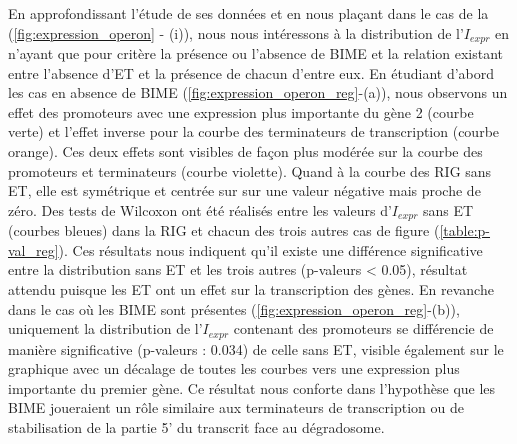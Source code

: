 \documentclass[12pt,a4paper]{report}
\begin{document}
\begin{onehalfspace}
En approfondissant l'étude de ses données et en nous plaçant dans le cas de la (\autoref{fig:expression_operon} - (i)), nous nous intéressons à la distribution de l'$I_{expr}$ en n'ayant que pour critère la présence ou l'absence de BIME et la relation existant entre l'absence d'ET et la présence de chacun d'entre eux. En étudiant d'abord les cas en absence de BIME (\autoref{fig:expression_operon_reg}-(a)), nous observons un effet des promoteurs avec une expression plus importante du gène 2 (courbe verte) et l'effet inverse pour la courbe des terminateurs de transcription (courbe orange). Ces deux effets sont visibles de façon plus modérée sur la courbe des promoteurs et terminateurs (courbe violette). Quand à la courbe des RIG sans ET, elle est symétrique et centrée sur sur une valeur négative mais proche de zéro. Des tests de Wilcoxon ont été réalisés entre les valeurs d'$I_{expr}$ sans ET (courbes bleues) dans la RIG et chacun des trois autres cas de figure (\autoref{table:p-val_reg}). Ces résultats nous indiquent qu'il existe une différence significative entre la distribution sans ET et les trois autres (p-valeurs < 0.05), résultat attendu puisque les ET ont un effet sur la transcription des gènes. En revanche dans le cas où les BIME sont présentes (\autoref{fig:expression_operon_reg}-(b)), uniquement la distribution de l'$I_{expr}$ contenant des promoteurs se différencie de manière significative (p-valeurs : 0.034) de celle sans ET, visible également sur le graphique avec un décalage de toutes les courbes vers une expression plus importante du premier gène. Ce résultat nous conforte dans l'hypothèse que les BIME joueraient un rôle similaire aux terminateurs de transcription ou de stabilisation de la partie 5' du transcrit face au dégradosome.


\end{onehalfspace}
\end{document}

